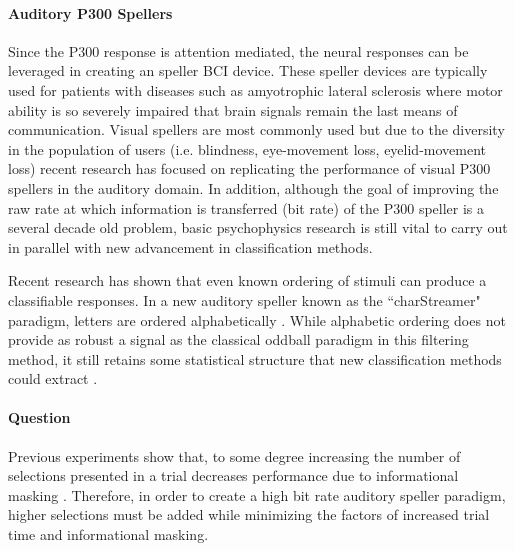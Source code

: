 \documentclass[12pt]{article}
\begin{document}
\paragraph{Auditory P300 Spellers} 
Since the P300 response is attention mediated, the neural responses
can be leveraged in creating an speller BCI device. These speller
devices are typically used for patients with diseases such as
amyotrophic lateral sclerosis where motor ability is so severely
impaired that brain signals remain the last means of
communication\cite{Nijboer2008}.  Visual spellers are most commonly
used but due to the diversity in the population of users (i.e.
blindness, eye-movement loss, eyelid-movement loss) recent research
has focused on replicating the performance of visual P300 spellers
in the auditory domain.  In addition, although the goal of improving
the raw rate at which information is transferred (bit rate) of
the P300 speller is a several decade old problem, basic
psychophysics research is still vital to carry out in parallel with
new advancement in classification methods.

Recent research has shown that even known ordering of stimuli can
produce a classifiable responses.  In a new auditory speller known
as the “charStreamer" paradigm, letters are ordered
alphabetically \cite{Hohne2014}.  While alphabetic ordering does not
provide as robust a signal as the classical oddball paradigm in this
filtering method, it still retains some statistical structure that
new classification methods could extract \cite{Hohne2014}.  



\paragraph{Question}

Previous experiments show that, to some degree increasing the number
of selections presented in a trial decreases performance due to
informational masking \cite{Maddox2012a}. Therefore, in order to
create a high bit rate auditory speller paradigm, higher selections
must be added while minimizing the factors of increased trial time
and informational masking. 
\end{document}
